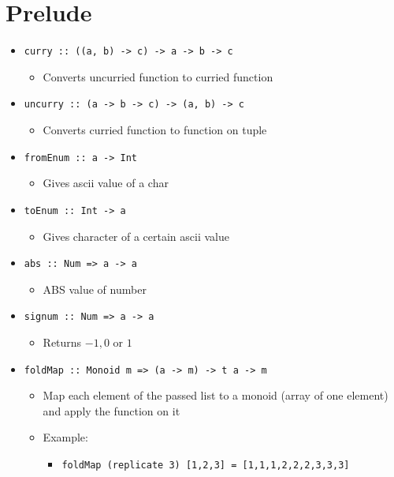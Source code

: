
\section{Prelude}
\begin{itemize}
    \item \verb+curry :: ((a, b) -> c) -> a -> b -> c+ 
        \begin{itemize}
            \item Converts uncurried function to curried function
        \end{itemize}
     \item \verb+uncurry :: (a -> b -> c) -> (a, b) -> c+
         \begin{itemize}
             \item Converts curried function to function on tuple
         \end{itemize}
    \item \verb+fromEnum :: a -> Int+
        \begin{itemize}
            \item Gives ascii value of a char
        \end{itemize}
    \item \verb+toEnum :: Int -> a+
        \begin{itemize}
            \item Gives character of a certain ascii value
        \end{itemize}
    \item \verb+abs :: Num => a -> a+
        \begin{itemize}
            \item ABS value of number
        \end{itemize}
    \item \verb+signum :: Num => a -> a+
        \begin{itemize}
            \item Returns $-1, 0$ or $1$
        \end{itemize}
    \item \verb+foldMap :: Monoid m => (a -> m) -> t a -> m+
        \begin{itemize}
            \item Map each element of the passed list to a monoid (array of one element) and apply the function on it
            \item Example:
                \begin{itemize}
                    \item \verb+foldMap (replicate 3) [1,2,3] = [1,1,1,2,2,2,3,3,3]+

\end{itemize}
\end{itemize}
\end{itemize}
